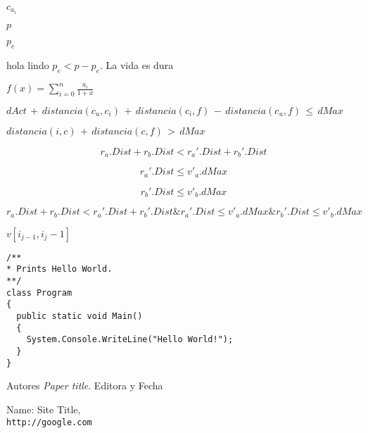 $c_{a_i}$

$p$

$p_e$

hola lindo $p_e < p - p_e$. La vida es dura

\( f(x) = \sum_{i=0}^{n} \frac{a_i}{1+x} \)

\( dAct\, +\, distancia(c_u, c_i)\, +\, distancia(c_i, f)\, -\, distancia(c_u, f)\, \leq\, dMax\)

\( distancia(i, c)\, +\, distancia(c, f)\, >\, dMax\)


\begin{equation*}
r_a.Dist + r_b.Dist < r_a'.Dist + r_b'.Dist \nonumber
\end{equation*}

\begin{equation*}
r_a'.Dist \leq v'_a.dMax
\end{equation*}

\begin{equation*}
r_b'.Dist \leq v'_b.dMax
\end{equation*}

\( r_a.Dist + r_b.Dist < r_a'.Dist + r_b'.Dist \& r_a'.Dist \leq v'_a.dMax \& r_b'.Dist \leq v'_b.dMax \)

$v[i_{j-1}, i_j-1]$

\begin{lstlisting}
/**
* Prints Hello World.
**/
class Program
{
  public static void Main()
  {
    System.Console.WriteLine("Hello World!");
  }
}
\end{lstlisting}


Autores
\textit{Paper title}. 
Editora y Fecha
 
Name: Site Title,
\\\texttt{http://google.com}